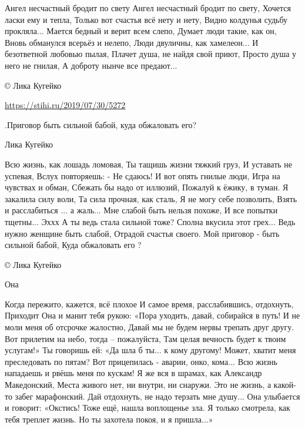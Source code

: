 \begin{itemize}
\obeycr
Ангел несчастный бродит по свету
Ангел несчастный бродит по свету,
Хочется ласки ему и тепла,
Только вот счастья всё нету и нету,
Видно колдунья судьбу прокляла...
Мается бедный и верит всем слепо,
Думает люди такие, как он,
Вновь обманулся всерьёз и нелепо,
Люди двуличны, как хамелеон...
И безответной любовью пылая,
Плачет душа, не найдя свой приют,
Просто душа у него не гнилая,
А доброту нынче все предают...
\restorecr

© Лика Кугейко\par

\url{https://stihi.ru/2019/07/30/5272}

 

.Приговор быть сильной бабой, куда обжаловать его?

Лика Кугейко

\obeycr
Всю жизнь, как лошадь ломовая,
Ты тащишь жизни тяжкий груз,
И уставать не успевая,
Вслух повторяешь: - Не сдаюсь!
И вот опять гнилые люди,
Игра на чувствах и обман,
Сбежать бы надо от иллюзий,
Пожалуй к ёжику, в туман.
Я закалила силу воли,
Та сила прочная, как сталь,
Я не могу себе позволить,
Взять и расслабиться ... а жаль...
Мне слабой быть нельзя похоже,
И все попытки тщетны... Эххх
А ты ведь стала сильной тоже?
Сполна вкусила этот грех...
Ведь нужно женщине быть слабой,
Отрадой счастья своего.
Мой приговор - быть сильной бабой,
Куда обжаловать его ?
\restorecr

© Лика Кугейко

 

Она

\obeycr
Когда пережито, кажется, всё плохое
И самое время, расслабившись, отдохнуть,
Приходит Она и манит тебя рукою:
«Пора уходить, давай, собирайся в путь!
И не моли меня об отсрочке жалостно,
Давай мы не будем нервы трепать друг другу.
Вот прилетим на небо, тогда – пожалуйста,
Там целая вечность будет к твоим услугам!»
Ты говоришь ей: «Да шла б ты... к кому другому!
Может, хватит меня преследовать по пятам?
Вот прицепилась - аварии, онко, кома...
Всю жизнь нападаешь и рвёшь меня по кускам!
Я же вся в шрамах, как Александр Македонский,
Места живого нет, ни внутри, ни снаружи.
Это не жизнь, а какой-то забег марафонский.
Дай отдохнуть, не надо терзать мне душу...
Она улыбается и говорит: «Окстись!
Тоже ещё, нашла воплощенье зла.
Я только смотрела, как тебя треплет жизнь.
Но ты захотела покоя, и я пришла...»
\restorecr


\end{itemize}
